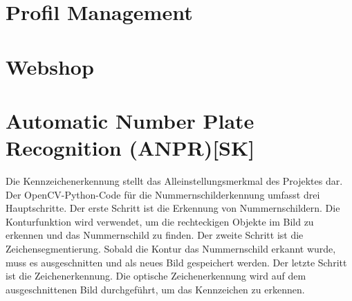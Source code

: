 \section{Profil Management}
\section{Webshop}
\section{Automatic Number Plate Recognition (ANPR)[SK]}
\label{lsg:def:anpr}
Die Kennzeichenerkennung stellt das Alleinstellungsmerkmal des Projektes dar. Der OpenCV-Python-Code für die Nummernschilderkennung umfasst drei Hauptschritte. Der erste Schritt ist die Erkennung von Nummernschildern. Die Konturfunktion wird verwendet, um die rechteckigen Objekte im Bild zu erkennen und das Nummernschild zu finden. Der zweite Schritt ist die Zeichensegmentierung. Sobald die Kontur das Nummernschild erkannt wurde, muss es ausgeschnitten und als neues Bild gespeichert werden. Der letzte Schritt ist die Zeichenerkennung. Die optische Zeichenerkennung wird auf dem ausgeschnittenen Bild durchgeführt, um das Kennzeichen zu erkennen.

